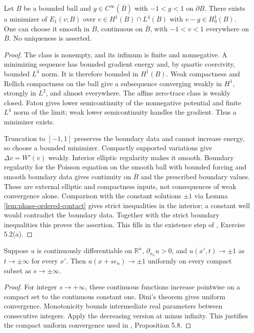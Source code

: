 \begin{theorem}\label{thm:phase-dirichlet-minimizer}
Let $B$ be a bounded ball and $g\in C^\infty(\overline B)$ with $-1<g<1$ on $\partial B$. There exists a minimizer of $E_1(v;B)$ over $v\in H^1(B)\cap L^4(B)$ with $v-g\in H^1_0(B)$. One can choose it smooth in $B$, continuous on $\overline B$, with $-1<v<1$ everywhere on $\overline B$. No uniqueness is asserted.
\end{theorem}
\begin{proof}
The class is nonempty, and its infimum is finite and nonnegative. A minimizing sequence has bounded gradient energy and, by quartic coercivity, bounded $L^4$ norm. It is therefore bounded in $H^1(B)$. Weak compactness and Rellich compactness on the ball give a subsequence converging weakly in $H^1$, strongly in $L^2$, and almost everywhere. The affine zero-trace class is weakly closed. Fatou gives lower semicontinuity of the nonnegative potential and finite $L^4$ norm of the limit; weak lower semicontinuity handles the gradient. Thus a minimizer exists.

Truncation to $[-1,1]$ preserves the boundary data and cannot increase energy, so choose a bounded minimizer. Compactly supported variations give $\Delta v=W'(v)$ weakly. Interior elliptic regularity makes it smooth. Boundary regularity for the Poisson equation on the smooth ball with bounded forcing and smooth boundary data gives continuity on $\overline B$ and the prescribed boundary values. These are external elliptic and compactness inputs, not consequences of weak convergence alone. Comparison with the constant solutions $\pm1$ via Lemma \ref{lem:phase-ordered-contact} gives strict inequalities in the interior; a constant well would contradict the boundary data. Together with the strict boundary inequalities this proves the assertion. This fills in the existence step of \cite{ChAC}, Exercise 5.2(a).
\end{proof}

\begin{lemma}\label{lem:phase-translate-limits}
Suppose $u$ is continuously differentiable on $\mathbb R^n$, $\partial_{x_n}u>0$, and
$u(x',t)\to\pm1$ as $t\to\pm\infty$ for every $x'$. Then $u(x+se_n)\to\pm1$ uniformly on every compact subset as $s\to\pm\infty$.
\end{lemma}
\begin{proof}
For integer $s\to+\infty$, these continuous functions increase pointwise on a compact set to the continuous constant one. Dini's theorem gives uniform convergence. Monotonicity bounds intermediate real parameters between consecutive integers. Apply the decreasing version at minus infinity. This justifies the compact uniform convergence used in \cite{ChAC}, Proposition 5.8.
\end{proof}

